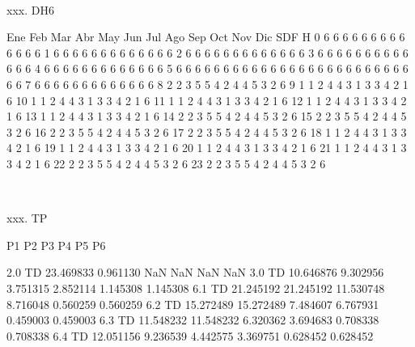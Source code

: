 \documentclass[a4paper,10pt]{article}
\begin{document}
\begin{Form}
\

xxx. DH6

    Ene  Feb  Mar  Abr  May  Jun  Jul  Ago  Sep  Oct  Nov  Dic  SDF
H                                                                  
0     6    6    6    6    6    6    6    6    6    6    6    6    6
1     6    6    6    6    6    6    6    6    6    6    6    6    6
2     6    6    6    6    6    6    6    6    6    6    6    6    6
3     6    6    6    6    6    6    6    6    6    6    6    6    6
4     6    6    6    6    6    6    6    6    6    6    6    6    6
5     6    6    6    6    6    6    6    6    6    6    6    6    6
6     6    6    6    6    6    6    6    6    6    6    6    6    6
7     6    6    6    6    6    6    6    6    6    6    6    6    6
8     2    2    3    5    5    4    2    4    4    5    3    2    6
9     1    1    2    4    4    3    1    3    3    4    2    1    6
10    1    1    2    4    4    3    1    3    3    4    2    1    6
11    1    1    2    4    4    3    1    3    3    4    2    1    6
12    1    1    2    4    4    3    1    3    3    4    2    1    6
13    1    1    2    4    4    3    1    3    3    4    2    1    6
14    2    2    3    5    5    4    2    4    4    5    3    2    6
15    2    2    3    5    5    4    2    4    4    5    3    2    6
16    2    2    3    5    5    4    2    4    4    5    3    2    6
17    2    2    3    5    5    4    2    4    4    5    3    2    6
18    1    1    2    4    4    3    1    3    3    4    2    1    6
19    1    1    2    4    4    3    1    3    3    4    2    1    6
20    1    1    2    4    4    3    1    3    3    4    2    1    6
21    1    1    2    4    4    3    1    3    3    4    2    1    6
22    2    2    3    5    5    4    2    4    4    5    3    2    6
23    2    2    3    5    5    4    2    4    4    5    3    2    6 \

\

xxx. TP

               P1         P2         P3        P4        P5        P6
                                                                     
2.0 TD  23.469833   0.961130        NaN       NaN       NaN       NaN
3.0 TD  10.646876   9.302956   3.751315  2.852114  1.145308  1.145308
6.1 TD  21.245192  21.245192  11.530748  8.716048  0.560259  0.560259
6.2 TD  15.272489  15.272489   7.484607  6.767931  0.459003  0.459003
6.3 TD  11.548232  11.548232   6.320362  3.694683  0.708338  0.708338
6.4 TD  12.051156   9.236539   4.442575  3.369751  0.628452  0.628452 \


\end{Form}
\end{document}

